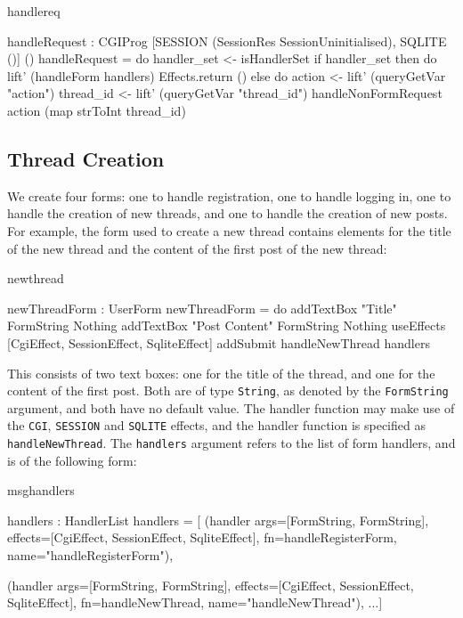 \begin{SaveVerbatim}{handlereq}

handleRequest : CGIProg 
     [SESSION (SessionRes SessionUninitialised), 
      SQLITE ()] ()
handleRequest = do 
  handler_set <- isHandlerSet
  if handler_set then do
    lift' (handleForm handlers)
    Effects.return ()
  else do
    action <- lift' (queryGetVar "action")
    thread_id <- lift' (queryGetVar "thread_id")
    handleNonFormRequest action (map strToInt thread_id)

\end{SaveVerbatim}

\subsection{Thread Creation}
We create four forms: one to handle registration, one to handle logging in,
one to handle the creation of new threads, and one to handle the creation of
new posts. For example, the form used to create a new thread
contains elements for the title of the new thread and the content of the
first post of the new thread:

\begin{SaveVerbatim}{newthread}

newThreadForm : UserForm
newThreadForm = do
  addTextBox "Title" FormString Nothing
  addTextBox "Post Content" FormString Nothing 
  useEffects [CgiEffect, SessionEffect, SqliteEffect]
  addSubmit handleNewThread handlers

\end{SaveVerbatim}

\noindent
This consists of two text boxes: one for the title of the thread, and one
for the content of the first post. Both are of type \texttt{String}, as denoted
by the \texttt{FormString} argument, and both have no default value. The
handler function may make use of the \texttt{CGI}, \texttt{SESSION} and
\texttt{SQLITE} effects, and the handler function is specified as
\texttt{handleNewThread}. The \texttt{handlers} argument refers to the list of
form handlers, and is of the following form:

\begin{SaveVerbatim}{msghandlers}

handlers : HandlerList
handlers = [
 (handler args=[FormString, FormString], 
          effects=[CgiEffect, SessionEffect, SqliteEffect], 
          fn=handleRegisterForm, 
          name="handleRegisterForm"),
  
 (handler args=[FormString, FormString], 
          effects=[CgiEffect, SessionEffect, SqliteEffect], 
          fn=handleNewThread, 
          name="handleNewThread"),
     ...]

\end{SaveVerbatim}
\noindent
{}

